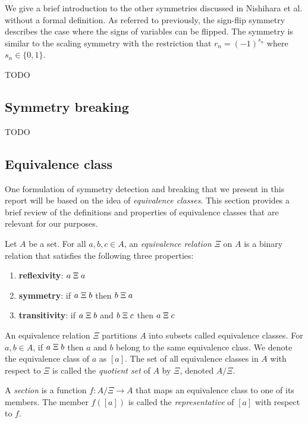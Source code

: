 We give a brief introduction to the other symmetries discussed in Nishihara et al. without a formal definition. As referred to previously, the sign-flip symmetry describes the case where the signs of variables can be flipped. The symmetry is similar to the scaling symmetry with the restriction that $r_n=(-1)^{s_n}$ where $s_n\in\{0,1\}$.

TODO


\subsection{Symmetry breaking}

TODO


\subsection{Equivalence class}

One formulation of symmetry detection and breaking that we present in this report will be based on the idea of \textit{equivalence classes}. This section provides a brief review of the definitions and properties of equivalence classes that are relevant for our purposes.

\begin{defn}
Let $A$ be a set. For all $a,b,c\in A$, an \textit{equivalence relation} $\Xi$ on $A$ is a binary relation that satisfies the following three properties:
\begin{enumerate}

\item
\textbf{reflexivity}: $a\;\Xi\; a$

\item
\textbf{symmetry}: if $a\;\Xi\; b$ then $b\;\Xi\; a$

\item
\textbf{transitivity}: if $a\;\Xi\; b$ and $b\;\Xi\; c$ then $a\;\Xi\; c$

\end{enumerate}
An equivalence relation $\Xi$ partitions $A$ into subsets called equivalence classes. For $a,b\in A$, if $a\;\Xi\; b$ then $a$ and $b$ belong to the same equivalence class. We denote the equivalence class of $a$ as $[a]$. The set of all equivalence classes in $A$ with respect to $\Xi$ is called the \textit{quotient set} of $A$ by $\Xi$, denoted $A/\Xi$.
\end{defn}

\begin{defn}
A \textit{section} is a function $f:A/\Xi\rightarrow A$ that maps an equivalence class to one of its members. The member $f([a])$ is called the \textit{representative} of $[a]$ with respect to $f$.
\end{defn}

